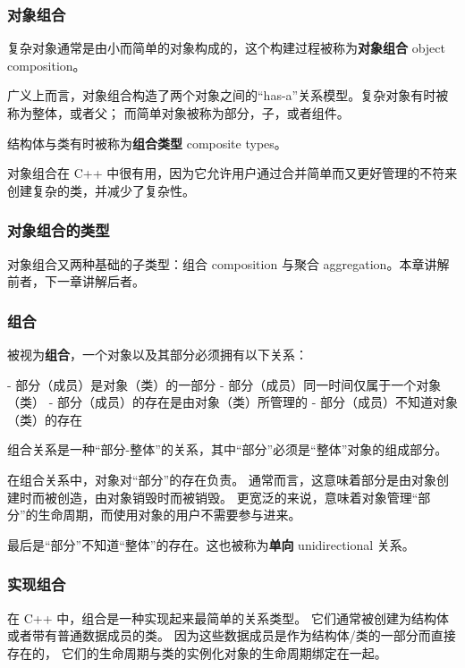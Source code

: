 \documentclass[../../LearnCpp.tex]{subfiles}
\begin{document}

\subsubsection*{对象组合}

复杂对象通常是由小而简单的对象构成的，这个构建过程被称为\textbf{对象组合} object composition。

广义上而言，对象组合构造了两个对象之间的“has-a”关系模型。复杂对象有时被称为整体，或者父；
而简单对象被称为部分，子，或者组件。

结构体与类有时被称为\textbf{组合类型} composite types。

对象组合在 C++ 中很有用，因为它允许用户通过合并简单而又更好管理的不符来创建复杂的类，并减少了复杂性。

\subsubsection*{对象组合的类型}

对象组合又两种基础的子类型：组合 composition 与聚合 aggregation。本章讲解前者，下一章讲解后者。

\subsubsection*{组合}

被视为\textbf{组合}，一个对象以及其部分必须拥有以下关系：

- 部分（成员）是对象（类）的一部分
- 部分（成员）同一时间仅属于一个对象（类）
- 部分（成员）的存在是由对象（类）所管理的
- 部分（成员）不知道对象（类）的存在

组合关系是一种“部分-整体”的关系，其中“部分”必须是“整体”对象的组成部分。

在组合关系中，对象对“部分”的存在负责。
通常而言，这意味着部分是由对象创建时而被创造，由对象销毁时而被销毁。
更宽泛的来说，意味着对象管理“部分”的生命周期，而使用对象的用户不需要参与进来。

最后是“部分”不知道“整体”的存在。这也被称为\textbf{单向} unidirectional 关系。

\subsubsection*{实现组合}

在 C++ 中，组合是一种实现起来最简单的关系类型。
它们通常被创建为结构体或者带有普通数据成员的类。
因为这些数据成员是作为结构体/类的一部分而直接存在的，
它们的生命周期与类的实例化对象的生命周期绑定在一起。
\end{document}
